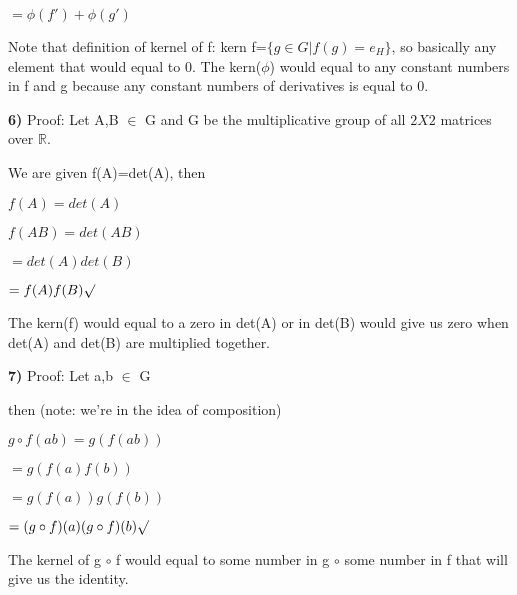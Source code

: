 \documentclass{article}
\begin{document}
 
 \hspace{.6in}$=\phi(f')+\phi(g')$
 
 \medskip

Note that definition of kernel of f: kern f=$\{g \in G | f(g)=e_{H} \}$, so basically any element that would equal to 0. The kern($\phi$) would equal to any constant numbers in f and g because any constant numbers of derivatives is equal to 0. 


\newpage

\textbf{6)}  Proof: Let A,B $\in$ G and G be the multiplicative group of all $2X2$ matrices over $\mathbb{R}$.

\medskip

We are given f(A)=det(A), then

\medskip

$f(A)=det(A)$


$f(AB)=det(AB)$


\hspace{.45in}$=det(A)det(B)$


\hspace{.45in}$=f(A)f(B) \surd$

\medskip

The kern(f) would equal to a zero in det(A) or in det(B) would give us zero when det(A) and det(B) are multiplied together.

\newpage

\textbf{7)} Proof: Let a,b $\in$ G

\medskip

then (note: we're in the idea of composition)

\medskip

$g \circ f (ab)=g(f(ab))$

\medskip

\hspace{.55in}$=g(f(a)f(b))$

\medskip

\hspace{.55in}$=g(f(a))g(f(b))$

\medskip

\hspace{.55in}$=(g\circ f)(a)(g\circ f)(b) \surd$

\medskip

\medskip


The kernel of g $\circ$ f would equal to some number in g $\circ$ some number in f that will give us the identity. 
\end{document}

